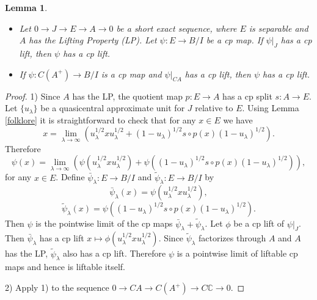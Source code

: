 \documentclass{article}%
\newtheorem{lemma}[theorem]{Lemma}
\begin{document}
\begin{lemma}\label{cpLiftFromUnitization} \begin{itemize}
 \item[(1)] Let $0\to J\to E\to A\to 0$ be a  short exact sequence, where $E$ is separable  and  $A$ has the  Lifting Property (LP). Let  $\psi: E\to B/I$ be a cp map. If $\psi|_J$ has a cp lift, then $\psi$ has a cp lift.

\item[(2)] If $\psi: C(A^+)\to B/I$ is a cp map and $\psi|_{CA}$ has  a cp lift, then $\psi$ has  a cp lift.
\end{itemize}
\end{lemma}
\begin{proof} 1) Since $A$ has the LP, the quotient map $p: E \to A$ has a cp split $s: A\to E$. Let $\{u_{\lambda}\}$ be a quasicentral approximate unit for $J$ relative to $E$. Using Lemma \ref{folklore} it is straightforward to check that for any $x\in E$ we have
$$x = \lim_{\lambda\to \infty} \left(u_{\lambda}^{1/2}xu_{\lambda}^{1/2} + (1-u_{\lambda})^{1/2}  s\circ p(x) (1-u_{\lambda})^{1/2}\right).$$
Therefore
$$\psi(x) = \lim_{\lambda\to \infty} \left(\psi\left(u_{\lambda}^{1/2}xu_{\lambda}^{1/2}\right) + \psi\left((1-u_{\lambda})^{1/2}  s\circ p(x) (1-u_{\lambda})^{1/2}\right)\right), $$ for any $x\in E$. Define $\bar\psi_{\lambda}: E \to B/I$ and $\tilde \psi_{\lambda}: E \to B/I$ by
$$\bar\psi_{\lambda}(x) = \psi\left(u_{\lambda}^{1/2}xu_{\lambda}^{1/2}\right),$$ $$ \tilde\psi_{\lambda}(x) = \psi\left((1-u_{\lambda})^{1/2}s\circ p(x)(1-u_{\lambda})^{1/2}\right).$$ Then $\psi$ is the pointwise limit of the cp maps $\bar\psi_{\lambda} + \tilde \psi_{\lambda}$. Let $\phi$ be a cp lift of $\psi|_J$. Then $\bar\psi_{\lambda}$ has a cp lift $x\mapsto \phi(u_{\lambda}^{1/2}xu_{\lambda}^{1/2})$. Since $\tilde\psi_{\lambda}$ factorizes through $A$ and $A$ has the LP,  $\tilde\psi_{\lambda}$  also has a cp lift. Therefore $\psi$ is a pointwise limit of liftable cp maps and hence is liftable itself.

2) Apply 1) to the sequence $0\to CA\to C(A^+)\to C\mathbb C\to 0$.
\end{proof}
\end{document}
